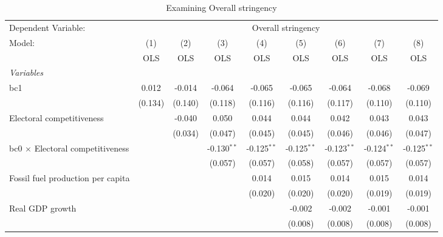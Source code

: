
\begin{table}[htbp]
   \caption{Examining Overall stringency}
   \centering
   \begin{tabular}{lcccccccc}
      \toprule
      Dependent Variable: & \multicolumn{8}{c}{Overall stringency}\\
      Model:                                  & (1)     & (2)     & (3)           & (4)           & (5)           & (6)           & (7)           & (8)\\  
                                              &  OLS    & OLS     & OLS           & OLS           & OLS           & OLS           & OLS           & OLS\\  
      \midrule
      \emph{Variables}\\
      bc1                                     & 0.012   & -0.014  & -0.064        & -0.065        & -0.065        & -0.064        & -0.068        & -0.069\\   
                                              & (0.134) & (0.140) & (0.118)       & (0.116)       & (0.116)       & (0.117)       & (0.110)       & (0.110)\\   
      Electoral competitiveness               &         & -0.040  & 0.050         & 0.044         & 0.044         & 0.042         & 0.043         & 0.043\\   
                                              &         & (0.034) & (0.047)       & (0.045)       & (0.045)       & (0.046)       & (0.046)       & (0.047)\\   
      bc0 $\times$ Electoral competitiveness  &         &         & -0.130$^{**}$ & -0.125$^{**}$ & -0.125$^{**}$ & -0.123$^{**}$ & -0.124$^{**}$ & -0.125$^{**}$\\   
                                              &         &         & (0.057)       & (0.057)       & (0.058)       & (0.057)       & (0.057)       & (0.057)\\   
      Fossil fuel production per capita       &         &         &               & 0.014         & 0.015         & 0.014         & 0.015         & 0.014\\   
                                              &         &         &               & (0.020)       & (0.020)       & (0.020)       & (0.019)       & (0.019)\\   
      Real GDP growth                         &         &         &               &               & -0.002        & -0.002        & -0.001        & -0.001\\   
                                              &         &         &               &               & (0.008)       & (0.008)       & (0.008)       & (0.008)\\   

\end{tabular}
\end{table}
